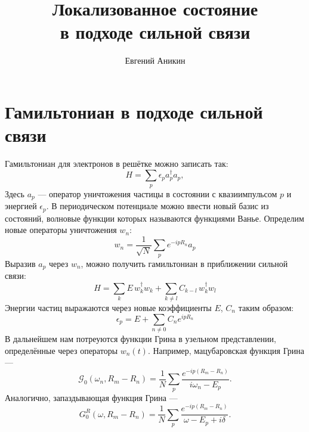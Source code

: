 \documentclass{article}
\title{Локализованное состояние\\ в подходе сильной связи}
\author{Евгений Аникин}
\begin{document}
\maketitle
\section{Гамильтониан в подходе сильной связи}
Гамильтониан для электронов в решётке можно записать так:
\begin{equation}
	H = \sum_p \epsilon_p a_p^{\dagger} a_p,
\end{equation}
Здесь $a_p$ --- оператор уничтожения частицы в состоянии с квазиимпульсом $p$ и энергией
$\epsilon_p$. В периодическом потенциале можно ввести новый базис из состояний, волновые
функции которых называются функциями Ванье. Определим новые операторы уничтожения $w_n$:
\begin{equation}
	w_n = \frac{1}{\sqrt{N}} \sum_p e^{-ipR_n} a_p
\end{equation}
Выразив $a_p$ через $w_n$, можно получить гамильтониан в приближении сильной связи:
\begin{equation}
	\label{hamiltonian}
	H = \sum_k E\,w_k^{\dagger}w_k + \sum_{k\ne l} C_{k-l}\, w_k^{\dagger} w_l
\end{equation}
Энергии частиц выражаются через новые коэффициенты $E$, $C_n$ таким образом:
\begin{equation}
	\epsilon_p = E + \sum_{n\ne 0} C_n e^{ipR_n}
\end{equation}
В дальнейшем нам потреуются функции Грина в узельном представлении, определённые через
операторы $w_n(t)$. Например, мацубаровская функция Грина --- 
\begin{equation}
	\mathcal{G}_0(\omega_n,R_m - R_n) = 
			\frac{1}{N}\sum_p  \frac{e^{-ip(R_m - R_n)}}{i\omega_n - E_p}.
\end{equation}
Аналогично, запаздывающая функция Грина --- 
\begin{equation}
	G_0^R(\omega,R_m - R_n) = 
			\frac{1}{N}\sum_p \frac{e^{-ip(R_m - R_n)}}{\omega - E_p + i\delta}.
\end{equation}
\end{document}
